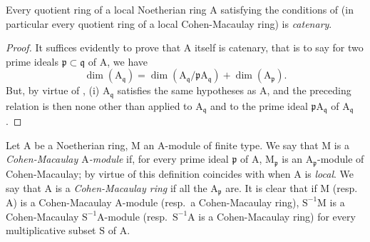 \begin{corollary}[16.5.12]
\label{0.16.5.12}
Every quotient ring of a local Noetherian ring $\mathrm{A}$ satisfying the conditions of  (in particular every quotient ring of a local Cohen-Macaulay ring) is \emph{catenary}.
\end{corollary}

\begin{proof}
It suffices evidently to prove that $\mathrm{A}$ itself is catenary, that is to say for two prime ideals $\mathfrak{p}\subset\mathfrak{q}$ of $\mathrm{A}$, we have 
\[
  \dim(\mathrm{A}_\mathfrak{q})=\dim(\mathrm{A}_\mathfrak{q}/\mathfrak{p}\mathrm{A}_\mathfrak{q})+\dim(\mathrm{A}_\mathfrak{p}).
\]
But, by virtue of , (i) $\mathrm{A}_\mathfrak{q}$ satisfies the same hypotheses as $\mathrm{A}$, and the preceding relation is then none other than  applied to $\mathrm{A}_\mathfrak{q}$ and to the prime ideal $\mathfrak{p}\mathrm{A}_\mathfrak{q}$ of $\mathrm{A}_\mathfrak{q}$.
\end{proof}

\begin{env}[16.5.13]
\label{0.16.5.13}
Let $\mathrm{A}$ be a Noetherian ring, $\mathrm{M}$ an $\mathrm{A}$-module of finite type.
We say that $\mathrm{M}$ is a \emph{Cohen-Macaulay $\mathrm{A}$-module} if, for every prime ideal $\mathfrak{p}$ of $\mathrm{A}$, $\mathrm{M}_\mathfrak{p}$ is an $\mathrm{A}_\mathfrak{p}$-module of Cohen-Macaulay; by virtue of  this definition coincides with  when $\mathrm{A}$ is \emph{local}.
We say that $\mathrm{A}$ is a \emph{Cohen-Macaulay ring} if all the $\mathrm{A}_\mathfrak{p}$ are.
It is clear that if $\mathrm{M}$ (resp.~$\mathrm{A}$) is a Cohen-Macaulay $\mathrm{A}$-module (resp.~a Cohen-Macaulay ring), $\mathrm{S}^{-1}\mathrm{M}$ is a Cohen-Macaulay $\mathrm{S}^{-1}\mathrm{A}$-module (resp.~$\mathrm{S}^{-1}\mathrm{A}$ is a Cohen-Macaulay ring) for every multiplicative subset $\mathrm{S}$ of $\mathrm{A}$.
\end{env}
